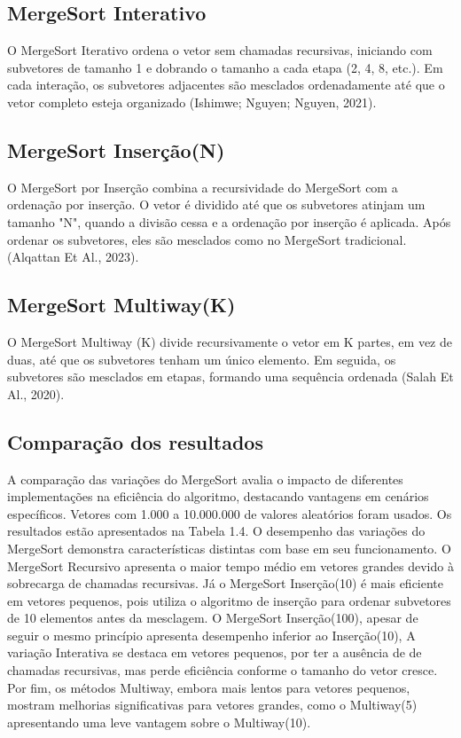 \documentclass{SBCbookchapter}
\begin{document}
\subsection{MergeSort Interativo}
O MergeSort Iterativo ordena o vetor sem chamadas recursivas, iniciando com subvetores de tamanho 1 e dobrando o tamanho a cada etapa (2, 4, 8, etc.). Em cada interação, os subvetores adjacentes são mesclados ordenadamente até que o vetor completo esteja organizado (Ishimwe; Nguyen; Nguyen, 2021).

\subsection{MergeSort Inserção(N)}
O MergeSort por Inserção combina a recursividade do MergeSort com a ordenação por inserção. O vetor é dividido até que os subvetores atinjam um tamanho "N", quando a divisão cessa e a ordenação por inserção é aplicada. Após ordenar os subvetores, eles são mesclados como no MergeSort tradicional. (Alqattan Et Al., 2023).

\subsection{MergeSort Multiway(K)}
O MergeSort Multiway (K) divide recursivamente o vetor em K partes, em vez de duas, até que os subvetores tenham um único elemento. Em seguida, os subvetores são mesclados em etapas, formando uma sequência ordenada (Salah Et Al., 2020).

\subsection{Comparação dos resultados}
A comparação das variações do MergeSort avalia o impacto de diferentes implementações na eficiência do algoritmo, destacando vantagens em cenários específicos. Vetores com 1.000 a 10.000.000 de valores aleatórios foram usados. Os resultados estão apresentados na Tabela 1.4.
O desempenho das variações do MergeSort demonstra características distintas com base em seu funcionamento. O MergeSort Recursivo apresenta o maior tempo médio em vetores grandes devido à sobrecarga de chamadas recursivas. Já o MergeSort Inserção(10) é mais eficiente em vetores pequenos, pois utiliza o algoritmo de inserção para ordenar  subvetores de 10 elementos antes da mesclagem. O MergeSort Inserção(100), apesar de seguir o mesmo princípio apresenta desempenho inferior ao Inserção(10), A variação Interativa se destaca em vetores pequenos, por  ter a ausência de de chamadas recursivas, mas perde eficiência conforme o tamanho do vetor cresce. Por fim, os métodos Multiway, embora mais lentos para vetores pequenos, mostram melhorias significativas para vetores grandes, como o Multiway(5) apresentando uma leve vantagem sobre o Multiway(10). 
\end{document}
